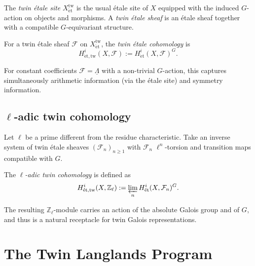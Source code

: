 \documentclass[11pt,a4paper]{article}
\numberwithin{equation}{section}
\newcommand{\Z}{\mathbb{Z}}
\newcommand{\Fcal}{\mathcal{F}}
\begin{document}
	\begin{definition}
		The \emph{twin \'etale site} $X_{\mathrm{\acute{e}t}}^{\mathrm{tw}}$ is the usual \'etale site of $X$ equipped with the 
		induced $G$-action on objects and morphisms.
		A \emph{twin \'etale sheaf} is an \'etale sheaf together with a compatible $G$-equivariant structure.
	\end{definition}
	
	\begin{definition}
		For a twin \'etale sheaf $\Fcal$ on $X_{\mathrm{\acute{e}t}}^{\mathrm{tw}}$, the \emph{twin \'etale cohomology} is
		\[
		H^i_{\mathrm{\acute{e}t,tw}}(X,\Fcal) := H^i_{\mathrm{\acute{e}t}}(X,\Fcal)^G.
		\]
	\end{definition}
	
	\begin{remark}
		For constant coefficients $\Fcal=\underline{\Lambda}$ with a non-trivial $G$-action, this captures 
		simultaneously arithmetic information (via the \'etale site) and symmetry information.
	\end{remark}
	
	\subsection{$\ell$-adic twin cohomology}
	
	Let $\ell$ be a prime different from the residue characteristic.
	Take an inverse system of twin \'etale sheaves $(\Fcal_n)_{n\ge 1}$ with $\Fcal_n$ $\ell^n$-torsion and 
	transition maps compatible with $G$.
	
	\begin{definition}
		The \emph{$\ell$-adic twin cohomology} is defined as
		\[
		H^i_{\mathrm{\acute{e}t,tw}}(X,\Z_\ell) := \varprojlim_n H^i_{\mathrm{\acute{e}t}}(X,\Fcal_n)^G.
		\]
	\end{definition}
	
	\begin{remark}
		The resulting $\Z_\ell$-module carries an action of the absolute Galois group and of $G$, 
		and thus is a natural receptacle for twin Galois representations.
	\end{remark}
	
	\section{The Twin Langlands Program}
	\label{sec:langlands}
	
\end{document}
